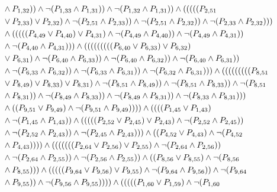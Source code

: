 \documentclass[10pt]{article}
\begin{document}
\begin{align*}
& \land \PV{1,32})) \land \lnot(\PV{1,33} \land \PV{1,31})) \land \lnot(\PV{1,32} \land \PV{1,31})) \land (((((\PV{2,51} \\
& \lor \PV{2,33}) \lor \PV{2,32}) \land \lnot(\PV{2,51} \land \PV{2,33})) \land \lnot(\PV{2,51} \land \PV{2,32})) \land \lnot(\PV{2,33} \land \PV{2,32}))) \\
& \land (((((\PV{4,49} \lor \PV{4,40}) \lor \PV{4,31}) \land \lnot(\PV{4,49} \land \PV{4,40})) \land \lnot(\PV{4,49} \land \PV{4,31})) \\
& \land \lnot(\PV{4,40} \land \PV{4,31}))) \land (((((((((\PV{6,40} \lor \PV{6,33}) \lor \PV{6,32}) \\
& \lor \PV{6,31}) \land \lnot(\PV{6,40} \land \PV{6,33})) \land \lnot(\PV{6,40} \land \PV{6,32})) \land \lnot(\PV{6,40} \land \PV{6,31})) \\
& \land \lnot(\PV{6,33} \land \PV{6,32})) \land \lnot(\PV{6,33} \land \PV{6,31})) \land \lnot(\PV{6,32} \land \PV{6,31}))) \land (((((((((\PV{8,51} \\
& \lor \PV{8,49}) \lor \PV{8,33}) \lor \PV{8,31}) \land \lnot(\PV{8,51} \land \PV{8,49})) \land \lnot(\PV{8,51} \land \PV{8,33})) \land \lnot(\PV{8,51} \\
& \land \PV{8,31})) \land \lnot(\PV{8,49} \land \PV{8,33})) \land \lnot(\PV{8,49} \land \PV{8,31})) \land \lnot(\PV{8,33} \land \PV{8,31}))) \\
& \land ((\PV{9,51} \lor \PV{9,49}) \land \lnot(\PV{9,51} \land \PV{9,49})))) \land ((((\PV{1,45} \lor \PV{1,43}) \\
& \land \lnot(\PV{1,45} \land \PV{1,43})) \land (((((\PV{2,52} \lor \PV{2,45}) \lor \PV{2,43}) \land \lnot(\PV{2,52} \land \PV{2,45})) \\
& \land \lnot(\PV{2,52} \land \PV{2,43})) \land \lnot(\PV{2,45} \land \PV{2,43}))) \land ((\PV{4,52} \lor \PV{4,43}) \land \lnot(\PV{4,52} \\
& \land \PV{4,43})))) \land (((((((\PV{2,64} \lor \PV{2,56}) \lor \PV{2,55}) \land \lnot(\PV{2,64} \land \PV{2,56})) \\
& \land \lnot(\PV{2,64} \land \PV{2,55})) \land \lnot(\PV{2,56} \land \PV{2,55})) \land ((\PV{8,56} \lor \PV{8,55}) \land \lnot(\PV{8,56} \\
& \land \PV{8,55}))) \land (((((\PV{9,64} \lor \PV{9,56}) \lor \PV{9,55}) \land \lnot(\PV{9,64} \land \PV{9,56})) \land \lnot(\PV{9,64} \\
& \land \PV{9,55})) \land \lnot(\PV{9,56} \land \PV{9,55})))) \land (((((\PV{1,60} \lor \PV{1,59}) \land \lnot(\PV{1,60} \\

\end{align*}
\end{document}
